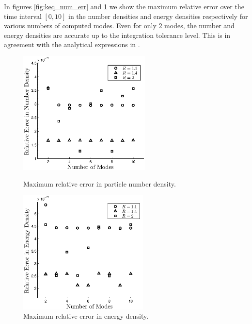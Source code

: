 In figures \ref{fig:keq_num_err} and  \ref{fig:keq_E_err} we show the maximum relative error over the time interval $[0,10]$ in the number densities and energy densities respectively for various numbers of computed modes. Even for only $2$ modes, the number and energy densities are accurate up to the integration tolerance level.  This is in agreement with the analytical expressions in .

\begin{figure}[H]
 \begin{minipage}[b]{0.5\linewidth}
\centerline{\includegraphics[height=6.2cm]{03-birrell/SpectralMethodBoltzmann/keq_num_err.eps}}
\caption{Maximum relative error in particle number density.}\label{fig:keq_num_err}
 \end{minipage}
 \hspace{0.5cm}
 \begin{minipage}[b]{0.5\linewidth}
\centerline{\includegraphics[height=6.2cm]{03-birrell/SpectralMethodBoltzmann/keq_E_err.eps}}
\caption{Maximum relative error in energy density.}\label{fig:keq_E_err}
 \end{minipage}
 \end{figure}

